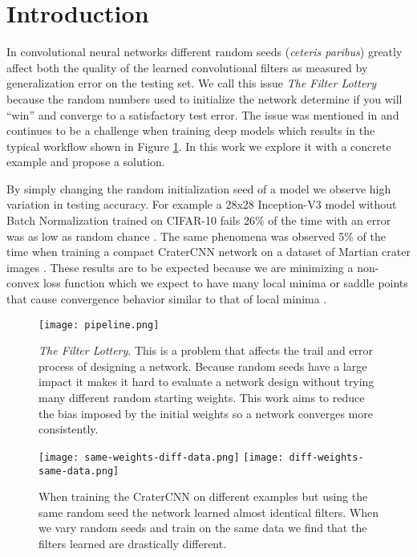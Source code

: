 \documentclass{article}
\begin{document}
\section{Introduction}



In convolutional neural networks \cite{lecun_convolutional_1995,lecun_deep_2015} different random seeds ({\em ceteris paribus}) greatly affect both the quality of the learned convolutional filters as measured by generalization error on the testing set.  We call this issue \textit{The Filter Lottery} because the random numbers used to initialize the network determine if you will ``win'' and converge to a satisfactory test error. The issue was mentioned in \cite{LeCun1998} and continues to be a challenge when training deep models which results in the typical workflow shown in Figure \ref{fig:pipeline}. In this work we explore it with a concrete example and propose a solution.

By simply changing the random initialization seed of a model we observe high variation in testing accuracy.  For example a 28x28 Inception-V3 model without Batch Normalization trained on CIFAR-10 fails 26\% of the time with an error was as low as random chance \cite{szegedy_rethinking_2015,krizhevsky_learning_2009}. The same phenomena was observed 5\% of the time when training a compact CraterCNN network on a dataset of Martian crater images \cite{cohen_crater_2016,bandeira_automatic_2010,cohen_randomout:_2016}. These results are to be expected because we are minimizing a non-convex loss function which we expect to have many local minima or saddle points that cause convergence behavior similar to that of local minima \cite{dauphin_identifying_2014}. 

\begin{figure}
  \begin{center}
    \texttt{[image: pipeline.png]}
     \caption{\textit{The Filter Lottery}. This is a problem that affects the trail and error process of designing a network. Because random seeds have a large impact it makes it hard to evaluate a network design without trying many different random starting weights. This work aims to reduce the bias imposed by the initial weights so a network converges more consistently. 
     }
      \label{fig:pipeline}
  \end{center}
\end{figure}	


\begin{figure*}
  \begin{center}
    \texttt{[image: same-weights-diff-data.png]}%
    \texttt{[image: diff-weights-same-data.png]}
     \caption{When training the CraterCNN on different examples but using the same random seed the network learned almost identical filters.
     When we vary random seeds and train on the same data we find that the filters learned are drastically different.
     }
      \label{fig:seed}
  \end{center}
\end{figure*}
\end{document}
